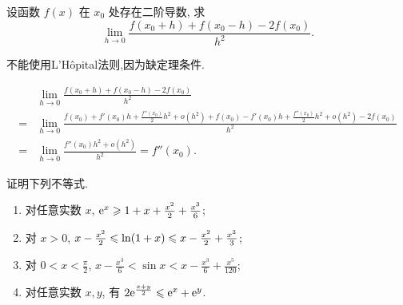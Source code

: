 \begin{exercise}[3.C.13]
    设函数 $f(x)$ 在 $x_0$ 处存在二阶导数, 求
    $$\lim_{h \to 0} \frac{f(x_0 + h) + f(x_0 - h) - 2f(x_0)}{h^2}.$$
\end{exercise}
\begin{remark}
    不能使用L'Hôpital法则,因为缺定理条件.
\end{remark}
\begin{solution}
    \begin{align*}
          & \lim_{h \to 0} \frac{f(x_0 + h) + f(x_0 - h) - 2f(x_0)}{h^2}                                                                  \\
        = & \lim_{h \to 0}
        \frac{f(x_0) + f'(x_0) h + \frac{f''(x_0)}{2} h^2 + o(h^2) + f(x_0) - f'(x_0) h + \frac{f''(x_0)}{2} h^2 + o(h^2) - 2f(x_0)}{h^2} \\
        = & \lim_{h \to 0} \frac{f''(x_0) h^2 + o(h^2)}{h^2} = f''(x_0).
    \end{align*}
\end{solution}



\begin{exercise}[3.C.14]
    证明下列不等式.
    \begin{enumerate}
        \item 对任意实数 $x$, $\mathrm{e}^x \geqslant 1 + x + \frac{x^2}{2} + \frac{x^3}{6}$;
        \item 对 $x > 0$, $x - \frac{x^2}{2} \leqslant \ln(1 + x) \leqslant x - \frac{x^2}{2} + \frac{x^3}{3}$;
        \item 对 $0 < x < \frac{\pi}{2}$, $x - \frac{x^3}{6} < \sin x < x - \frac{x^3}{6} + \frac{x^5}{120}$;
        \item 对任意实数 $x, y$, 有 $2 \mathrm{e}^{\frac{x+y}{2}} \leqslant \mathrm{e}^x + \mathrm{e}^y$.
    \end{enumerate}
\end{exercise}

